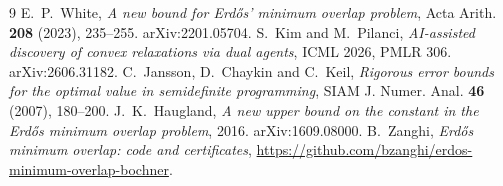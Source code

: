 \documentclass[11pt]{article}
\theoremstyle{definition}
\begin{document}
\begin{thebibliography}{9}
 E.~P.~White, \emph{A new bound for Erd\H{o}s'
  minimum overlap problem}, Acta Arith. \textbf{208} (2023), 235--255.
  arXiv:2201.05704.
 S.~Kim and M.~Pilanci, \emph{AI-assisted
  discovery of convex relaxations via dual agents}, ICML 2026, PMLR 306.
  arXiv:2606.31182.
 C.~Jansson, D.~Chaykin and C.~Keil, \emph{Rigorous
  error bounds for the optimal value in semidefinite programming}, SIAM
  J. Numer. Anal. \textbf{46} (2007), 180--200.
 J.~K.~Haugland, \emph{A new upper bound on the
  constant in the Erd\H{o}s minimum overlap problem}, 2016.
  arXiv:1609.08000.
 B.~Zanghi, \emph{Erd\H{o}s minimum overlap: code and
  certificates}, \url{https://github.com/bzanghi/erdos-minimum-overlap-bochner}.
\end{thebibliography}
\end{document}
